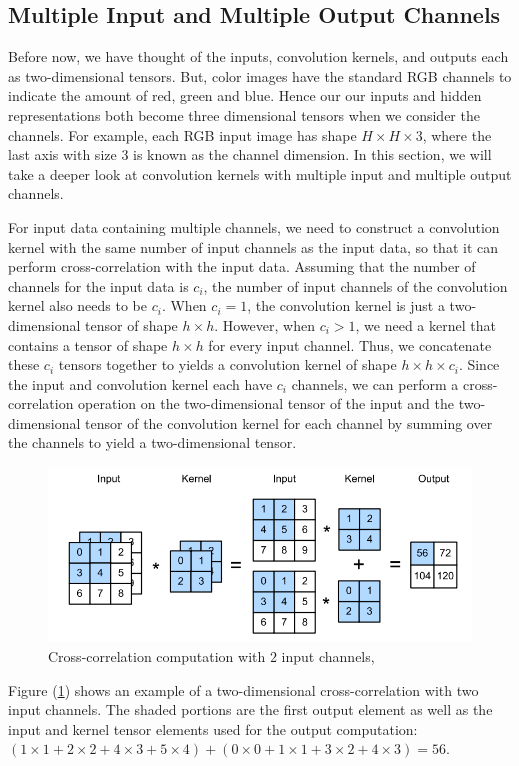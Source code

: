 \documentclass[12pt]{report}
\numberwithin{equation}{section}
\begin{document}
\subsection{Multiple Input and Multiple Output Channels}
Before now, we have thought of the inputs, convolution kernels, and outputs each as two-dimensional tensors. But, color images have the standard RGB channels to indicate the amount of red, green and blue. Hence our our inputs and hidden representations both become three dimensional tensors when we consider the channels. For example, each RGB input image has shape $H \times H \times 3$, where the last axis with size $3$ is known as the channel dimension. In this section, we will take a deeper look at convolution kernels with multiple input and multiple output channels.

For input data containing multiple channels, we need to construct a convolution kernel with the same number of input channels as the input data, so that it can perform cross-correlation with the input data. Assuming that the number of channels for the input data is $c_i$, the number of input channels of the convolution kernel also needs to be $c_i$. When $c_i = 1$, the convolution kernel is just a two-dimensional tensor of shape $h \times h$. However, when $c_i > 1$, we need a kernel that contains a tensor of shape $h \times h$ for every input channel. Thus, we concatenate these $c_i$ tensors together to yields a convolution kernel of shape $h \times h \times c_i$. Since the input and convolution kernel each have $c_i$ channels, we can perform a cross-correlation operation on the two-dimensional tensor of the input and the two-dimensional tensor of the convolution kernel for each channel by summing over the channels to yield a two-dimensional tensor. 
\begin{figure}[H]
\centering
\includegraphics[scale=0.9]{png/cross_corr_2_dim.png}
\caption[Cross-correlation computation with $2$ input channels]{Cross-correlation computation with $2$ input channels, \textbf{\cite{zhang2020dive}}}
\label{fig:2-dim}
\end{figure} \noindent
Figure (\ref{fig:2-dim}) shows an example of a two-dimensional cross-correlation with two input channels. The shaded portions are the first output element as well as the input and kernel tensor elements used for the output computation: $(1\times 1+2\times 2+4\times 3+5\times 4)+(0\times 0+1\times 1+3\times 2+4\times 3) = 56 $.
\end{document}
